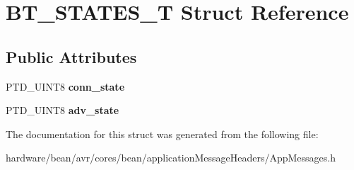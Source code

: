 \hypertarget{struct_b_t___s_t_a_t_e_s___t}{}\section{B\+T\+\_\+\+S\+T\+A\+T\+E\+S\+\_\+\+T Struct Reference}
\label{struct_b_t___s_t_a_t_e_s___t}
\subsection*{Public Attributes}
\begin{DoxyCompactItemize}
\item 
\hypertarget{struct_b_t___s_t_a_t_e_s___t_a06b16edf83d9bf148d6d9f238787998d}{}P\+T\+D\+\_\+\+U\+I\+N\+T8 {\bfseries conn\+\_\+state}\label{struct_b_t___s_t_a_t_e_s___t_a06b16edf83d9bf148d6d9f238787998d}

\item 
\hypertarget{struct_b_t___s_t_a_t_e_s___t_a346ea237f71d6e001b75170b6410d94d}{}P\+T\+D\+\_\+\+U\+I\+N\+T8 {\bfseries adv\+\_\+state}\label{struct_b_t___s_t_a_t_e_s___t_a346ea237f71d6e001b75170b6410d94d}

\end{DoxyCompactItemize}


The documentation for this struct was generated from the following file\+:\begin{DoxyCompactItemize}
\item 
hardware/bean/avr/cores/bean/application\+Message\+Headers/App\+Messages.\+h\end{DoxyCompactItemize}
